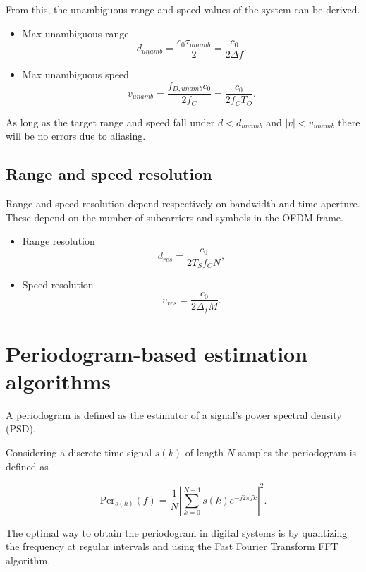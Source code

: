         From this, the unambiguous range and speed values of the system can be derived.
        
        \begin{itemize}
            \item Max unambiguous range
            $$ d_{unamb} = \frac{c_0 \tau_{unamb}}{2} = \frac{c_0}{2\Delta f}.$$
            \item Max unambiguous speed
            $$ v_{unamb} = \frac{f_{D,unamb} c_0}{2f_C} = \frac{c_0}{2f_C T_O}.$$
        \end{itemize}
        
        As long as the target range and speed fall under $d < d_{unamb}$ and $|v| < v_{unamb}$ there will be no errors due to aliasing.
        
    \subsection{Range and speed resolution}
    
        Range and speed resolution depend respectively on bandwidth and time aperture. These depend on the number of subcarriers and symbols in the OFDM frame.
        
        \begin{itemize}
            \item Range resolution
            $$ d_{res} = \frac{c_0}{2 T_S f_C N}, $$
            \item Speed resolution
            $$ v_{res} = \frac{c_0}{2\Delta_f M}. $$
        \end{itemize}
        

        
\section{Periodogram-based estimation algorithms}
    
    A periodogram is defined as the estimator of a signal's power spectral density (PSD).
    
    Considering a discrete-time signal $s(k)$ of length $N$ samples the periodogram is defined as
    
    \begin{equation}
        \text{Per}_{s(k)}(f) = \frac{1}{N}\left| \sum_{k=0}^{N-1} s(k)e^{-j2\pi fk}\right|^2.
    \end{equation}

    The optimal way to obtain the periodogram in digital systems is by quantizing the frequency at regular intervals and using the Fast Fourier Transform FFT algorithm.

